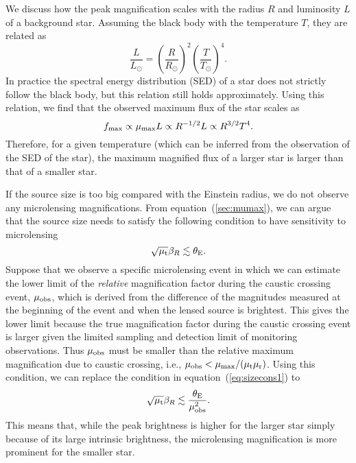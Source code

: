 \documentclass[showpacs,twocolumn,preprintnumbers,amsmath,amssymb,superscriptaddress,nofootinbib]{revtex4}
\begin{document}
We discuss how the peak magnification scales with the radius $R$
and luminosity $L$ of a background star. Assuming the black body with
the temperature $T$, they are related as
\begin{equation}
  \frac{L}{L_\odot}=\left(\frac{R}{R_\odot}\right)^2
  \left(\frac{T}{T_\odot}\right)^4.
  \label{eq:blackbody}
\end{equation}
In practice the spectral energy distribution (SED) of a star does not
strictly follow the black body, but this relation still holds
approximately. Using this relation, we find that the observed maximum
flux of the star scales as
\begin{equation}
  f_{\rm max}\propto \mu_{\rm max}L \propto R^{-1/2}L \propto
  R^{3/2}T^4.
  \label{eq:maxflux}
\end{equation}
Therefore, for a given temperature (which can be inferred from the
observation of the SED of the star), the maximum magnified flux of a
larger star is larger than that of a smaller star. 

If the source size is too big compared with the Einstein radius, we do
not observe any microlensing magnifications. From
equation~(\ref{sec:mumax}), we can argue that the source size needs
to satisfy the following condition to have sensitivity to microlensing
\begin{equation}
\sqrt{\mu_{\rm t}}\beta_R \lesssim \theta_{\rm E}.
\label{eq:sizecons1}
\end{equation}
Suppose that we observe a specific microlensing event in which we can
estimate the lower limit of the {\it relative} magnification factor during
the caustic crossing event, $\mu_{\rm obs}$, which is derived from the
difference of the magnitudes measured at the beginning of the event
and when the lensed source is brightest. This gives the lower limit
because the true magnification factor during the caustic crossing
event is larger given the limited sampling and detection limit of
monitoring observations. Thus $\mu_{\rm obs}$ must be smaller than the
relative maximum magnification due to caustic crossing, i.e.,  
$\mu_{\rm obs}<\mu_{\rm max}/(\mu_{\rm t}\mu_{\rm r})$.
Using this condition, we can replace the condition in 
equation~(\ref{eq:sizecons1}) to
\begin{equation}
\sqrt{\mu_{\rm t}}\beta_R \lesssim \frac{\theta_{\rm E}}{\mu_{\rm  obs}^2}.
\label{eq:sizecons2}
\end{equation}
This means that, while the peak brightness is higher for the larger
star simply because of its large intrinsic brightness, the
microlensing magnification is more prominent for the smaller star.
\end{document}

